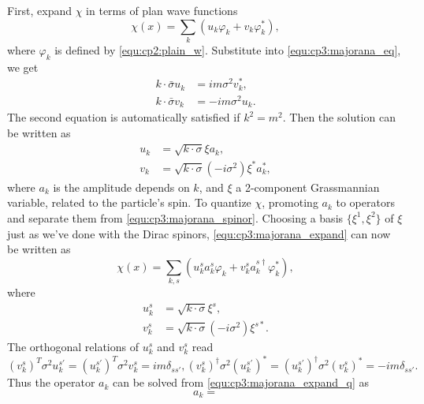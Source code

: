 \begin{problembody}
    \item First, expand $\chi$ in terms of plan wave functions
    \begin{equation}\label{equ:cp3:majorana_expand}
        \chi(x) = \sum_k \left(u_k \varphi_k + v_k \varphi_k^\ast\right),
    \end{equation}
    where $\varphi_k$ is defined by \eqref{equ:cp2:plain_w}. Substitute into \eqref{equ:cp3:majorana_eq}, we get
    \begin{subequations}
        \begin{align}
            k\cdot\bar{\sigma} u_k & = im\sigma^2 v_k^\ast, \\
            k\cdot\bar{\sigma} v_k & = -im\sigma^2 u_k.
        \end{align}
    \end{subequations}
    The second equation is automatically satisfied if $k^2 = m^2$. Then the solution can be written as
    \begin{subequations}\label{equ:cp3:majorana_spinor}
        \begin{align}
            u_k & = \sqrt{k\cdot\sigma}\xi a_k,\\
            v_k & = \sqrt{k\cdot\sigma} (-i\sigma^2) \xi^\ast a_k^\ast,
        \end{align}
    \end{subequations}
    where $a_k$ is the amplitude depends on $k$, and $\xi$ a 2-component Grassmannian variable, related to the particle's spin. To quantize
    $\chi$, promoting $a_k$ to operators and separate them from \eqref{equ:cp3:majorana_spinor}. Choosing a basis $\{\xi^1, \xi^2\}$ of $\xi$ just
    as we've done with the Dirac spinors, \eqref{equ:cp3:majorana_expand} can now be written as
    \begin{equation}\label{equ:cp3:majorana_expand_q}
        \chi(x) = \sum_{k, s} \left(u_k^s a_k^s \varphi_k + v_k^s a_k^{s\dagger} \varphi_k^\ast\right),
    \end{equation}
    where
    \begin{subequations}
        \begin{align}
            u_k^s & = \sqrt{k\cdot\sigma}\xi^s,\\
            v_k^s & = \sqrt{k\cdot\sigma} (-i\sigma^2) \xi^{s\ast}.
        \end{align}
    \end{subequations}
    The orthogonal relations of $u_k^s$ and $v_k^s$ read
    \begin{subequations}
        \begin{equation}
            (v_k^s)^T\sigma^2 u_k^{s'} = (u_k^{s'})^T\sigma^2 v_k^s = im\delta_{ss'},
        \end{equation}
        \begin{equation}
            (v_k^s)^\dagger\sigma^2 (u_k^{s'})^\ast = (u_k^{s'})^\dagger\sigma^2 (v_k^s)^\ast = -im\delta_{ss'}.
        \end{equation}
    \end{subequations}
    Thus the operator $a_k$ can be solved from \eqref{equ:cp3:majorana_expand_q} as 
    \begin{equation*}
        a_k = 
    \end{equation*}
\end{problembody}